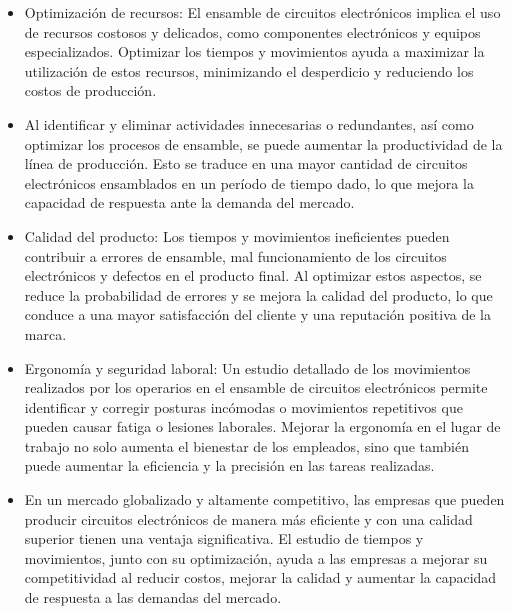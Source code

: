         \begin{itemize}
            \item Optimización de recursos: El ensamble de circuitos electrónicos implica el uso de recursos costosos y delicados, como componentes electrónicos y equipos especializados. Optimizar los tiempos y movimientos ayuda a maximizar la utilización de estos recursos, minimizando el desperdicio y reduciendo los costos de producción.
            \item  Al identificar y eliminar actividades innecesarias o redundantes, así como optimizar los procesos de ensamble, se puede aumentar la productividad de la línea de producción. Esto se traduce en una mayor cantidad de circuitos electrónicos ensamblados en un período de tiempo dado, lo que mejora la capacidad de respuesta ante la demanda del mercado.
            \item Calidad del producto: Los tiempos y movimientos ineficientes pueden contribuir a errores de ensamble, mal funcionamiento de los circuitos electrónicos y defectos en el producto final. Al optimizar estos aspectos, se reduce la probabilidad de errores y se mejora la calidad del producto, lo que conduce a una mayor satisfacción del cliente y una reputación positiva de la marca.
            \item Ergonomía y seguridad laboral: Un estudio detallado de los movimientos realizados por los operarios en el ensamble de circuitos electrónicos permite identificar y corregir posturas incómodas o movimientos repetitivos que pueden causar fatiga o lesiones laborales. Mejorar la ergonomía en el lugar de trabajo no solo aumenta el bienestar de los empleados, sino que también puede aumentar la eficiencia y la precisión en las tareas realizadas.
            \item  En un mercado globalizado y altamente competitivo, las empresas que pueden producir circuitos electrónicos de manera más eficiente y con una calidad superior tienen una ventaja significativa. El estudio de tiempos y movimientos, junto con su optimización, ayuda a las empresas a mejorar su competitividad al reducir costos, mejorar la calidad y aumentar la capacidad de respuesta a las demandas del mercado.
        \end{itemize}
    
    
